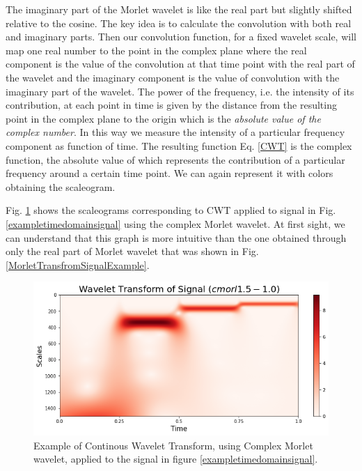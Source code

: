 \documentclass[12pt,a4paper]{report}
\begin{document}
The imaginary part of the Morlet wavelet is like the real part but slightly shifted relative to the cosine. The key idea is to calculate the convolution with both real and imaginary parts.  Then our convolution function, for a fixed wavelet scale, will map one real number to the point in the complex plane where the real component is the value of the convolution at that time point with the real part of the wavelet and the imaginary component is the value of convolution with the imaginary part of the wavelet. The power of the frequency, i.e. the intensity of its contribution, at each point in time is given by the distance from the resulting point in the complex plane to the origin which is the \emph{absolute value of the complex number}. In this way we measure the intensity of a particular frequency component as function of time. The resulting function Eq. \ref{CWT} is the complex function, the absolute value of which represents the contribution of a particular frequency around a certain time point. We can again represent it with colors obtaining the scaleogram.

Fig. \ref{ComplexMorletTransfromSignalExample} shows the scaleograms corresponding to CWT applied to signal in Fig. \ref{exampletimedomainsignal} using the complex Morlet wavelet. At first sight, we can understand that this graph is more intuitive than the one obtained through only the real part of Morlet wavelet that was shown in Fig. \ref{MorletTransfromSignalExample}.

\begin{figure}[!ht]
\includegraphics[scale=0.59]{ComplexMorletTransformSignalExample.PNG}
\caption{Example of Continous Wavelet Transform, using Complex Morlet wavelet, applied to the signal in figure \ref{exampletimedomainsignal}.}
\label{ComplexMorletTransfromSignalExample}
\end{figure}
\end{document}
